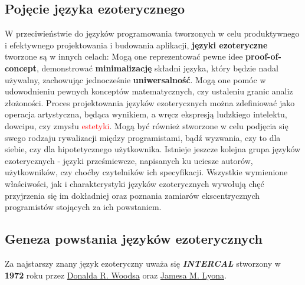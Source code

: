 \documentclass[fleqn,10pt]{SelfArx} %
\begin{document}
\subsection{Pojęcie języka ezoterycznego}
	W przeciwieństwie do języków programowania tworzonych w celu produktywnego i efektywnego
	projektowania i budowania aplikacji, \textbf{języki ezoteryczne} tworzone są w innych celach: Mogą one reprezentować pewne idee \textbf{proof-of-concept},
	demonstrować \textbf{minimalizację} składni języka, który będzie nadal używalny, zachowując jednocześnie \textbf{uniwersalność}.
	Mogą one pomóc w udowodnieniu pewnych konceptów matematycznych, czy ustaleniu granic analiz złożoności.
	Proces projektowania języków ezoterycznych można zdefiniować jako operacja artystyczna,
	będąca wynikiem, a wręcz ekspresją ludzkiego intelektu, dowcipu, czy zmysłu \textcolor{red}{estetyki}.
	Mogą być również stworzone w celu podjęcia się swego rodzaju rywalizacji między programistami, bądź wyzwania, czy to dla siebie, czy dla hipotetycznego użytkownika.
	Istnieje jeszcze kolejna grupa języków ezoterycznych - języki prześmiewcze, napisanych ku uciesze autorów, użytkowników, czy choćby czytelników ich specyfikacji.\cite{morr2015esoteric}
	Wszystkie wymienione właściwości, jak i charakterystyki języków ezoterycznych wywołują chęć przyjrzenia się im dokładniej oraz poznania zamiarów ekscentrycznych programistów stojących za ich powstaniem.


\subsection{Geneza powstania języków ezoterycznych}
Za najstarszy znany język ezoteryczny uważa się \textbf{\textit{INTERCAL}} stworzony w \textbf{1972} roku 
przez \underline{Donalda R. Woodsa} oraz \underline{Jamesa M. Lyona}.
\end{document}
